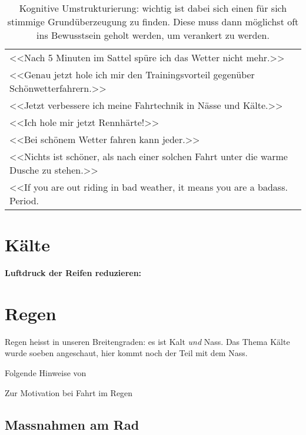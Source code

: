 \begin{table}
        \centering
        \begin{tabular}{l}
                \toprule
        <<Nach 5 Minuten im Sattel spüre ich das Wetter nicht mehr.>>\\
        <<Genau jetzt hole ich mir den Trainingsvorteil gegenüber Schönwetterfahrern.>>\\
        <<Jetzt verbessere ich meine Fahrtechnik in Nässe und Kälte.>>\\
        <<Ich hole mir jetzt Rennhärte!>>\\
        <<Bei schönem Wetter fahren kann jeder.>>\\
        <<Nichts ist schöner, als nach einer solchen Fahrt unter die warme Dusche zu stehen.>>\\
        <<If you are out riding in bad weather, it means you are a badass. Period. \cite[Rule \#9]{velominati2014rules}\\
                \bottomrule
        \end{tabular}
        \caption{Kognitive Umstrukturierung: wichtig ist dabei sich einen für sich stimmige Grundüberzeugung zu finden.
        Diese muss dann möglichst oft ins Bewusstsein geholt werden, um verankert zu werden.}
        \label{tab:kognitiveumstrukturierung}
\end{table}

\section{Kälte}

\textbf{Luftdruck der Reifen reduzieren:}
\section{Regen}
\label{sec:regen}

Regen heisst in unseren Breitengraden: es ist Kalt \emph{und} Nass.
Das Thema Kälte wurde soeben angeschaut, hier kommt noch der Teil mit dem Nass.

Folgende Hinweise von \cite{Glass2014cyclingrain,Hurford2014rainyride,Prinz2014rain,Lovell2015tipswetweather,gcn2013rain,gcn2015rain}

Zur Motivation bei Fahrt im Regen \cite{Magnuson2013rain}

\subsection{Massnahmen am Rad}

